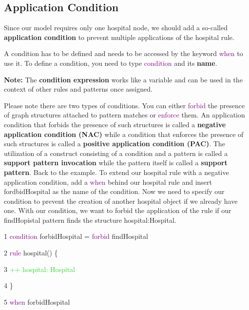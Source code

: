 \clearpage

\subsection{Application Condition}

Since our model requires only one hospital node, we should add a so-called \textbf{application condition} to prevent multiple applications of the hospital rule.\newline

A condition has to be defined and needs to be accessed by the keyword \textcolor{Purple}{when} to use it. To define a condition, you need to type \textcolor{Purple}{condition} and its \textbf{name}.

\textbf{Note:} The \textbf{condition expression} works like a variable and can be used in the context of other rules and patterns once assigned.\newline

Please note there are two types of conditions. You can either \textcolor{Purple}{forbid} the presence of graph structures attached to pattern matches or \textcolor{Purple}{enforce} them.
An application condition that forbids the presence of such structures is called a \textbf{negative application condition (NAC)} while a condition that enforces the presence of such structures is called a \textbf{positive application condition (PAC)}.
\newline
The utilization of a construct consisting of a condition and a pattern is called a \textbf{support pattern invocation} while the pattern itself is called a \textbf{support pattern}.\newline \newline
Back to the example. To extend our hospital rule with a negative application condition, add a \textcolor{Purple}{when} behind our hospital rule and insert \textsf{fordbidHospital} as the name of the condition. Now we need to specify our condition to prevent the creation of another hospital object if we already have one.\newline
With our condition, we want to forbid the application of the rule if our \textsf{findHopistal} pattern finds the structure \textsf{hospital:Hospital}.\newline

{

1 \hspace{0.5cm} \textcolor{Purple}{condition} forbidHospital = \textcolor{Purple}{forbid} findHospital 

2 \hspace{0.5cm} \textcolor{Purple}{rule} hospital() \{ 

3 \hspace{1cm} \textcolor{LimeGreen}{++ hospital: Hospital}

4 \hspace{0.5cm} \}

5 \hspace{0.5cm} \textcolor{Purple}{when} forbidHospital \newline


}

